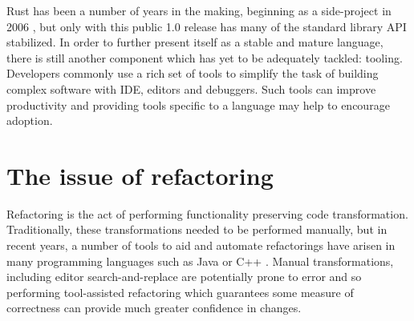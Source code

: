 Rust has been a number of years in the making, beginning as a side-project in 2006 \cite{faq15}, but only with this public 1.0 release has many of the standard library API stabilized. In order to further present itself as a stable and mature language, there is still another component which has yet to be adequately tackled: tooling. Developers commonly use a rich set of tools to simplify the task of building complex software with IDE, editors and debuggers. Such tools can improve productivity and providing tools specific to a language may help to encourage adoption.

\section{The issue of refactoring}\label{S:refactorintro}
Refactoring is the act of performing functionality preserving code transformation. Traditionally, these transformations needed to be performed manually, but in recent years, a number of tools to aid and automate refactorings have arisen in many programming languages such as Java or C++ \cite{brown2008tool}. Manual transformations, including editor search-and-replace are potentially prone to error and so performing tool-assisted refactoring which guarantees some measure of correctness can provide much greater confidence in changes.



